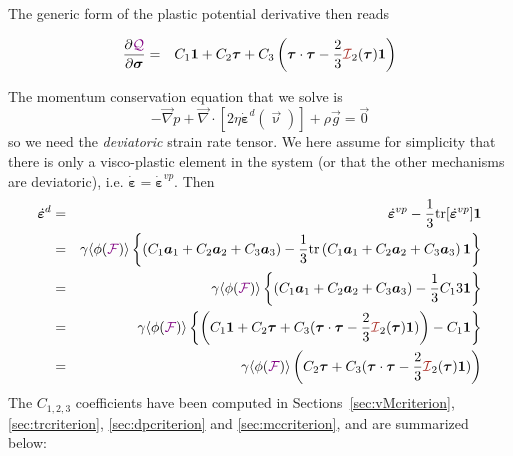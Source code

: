 The generic form of the plastic potential derivative then reads 
\begin{mdframed}[backgroundcolor=blue!5]
\begin{eqnarray}
\frac{\partial \QQQ}{\partial \bm\sigma}
&=&
C_1 {\bm 1} 
+
C_2 {\bm \tau} 
+
C_3  \left( \bm\tau\cdot\bm\tau - \frac23  {\III}_2(\bm\tau)  {\bm 1} \right)
\end{eqnarray}
\end{mdframed}

The momentum conservation equation that we solve is 
\[
-\vec\nabla p + \vec\nabla \cdot \left[
2 \eta \dot{\bm\varepsilon}^d(\vec\upnu) 
\right]+ \rho \vec g = \vec 0
\]
so we need the {\it deviatoric} strain rate tensor. 
We here assume for simplicity that there is only a visco-plastic element in the system
(or that the other mechanisms are deviatoric), 
i.e. $\dot{\bm\varepsilon}=\dot{\bm\varepsilon}^{vp}$.
Then 
\begin{eqnarray}
\dot{\bm\varepsilon}^d 
&=& \dot{\bm\varepsilon}^{vp} - \frac13 {\rm tr}[ \dot{\bm\varepsilon}^{vp}] {\bm 1} \nn\\
&=& \gamma \langle \phi(\FFF) \rangle 
\left\{
\left(C_1 {\bm a}_1 + C_2 {\bm a}_2 + C_3 {\bm a}_3 \right)
-\frac13 {\rm tr} \left(C_1 {\bm a}_1 + C_2 {\bm a}_2 + C_3 {\bm a}_3 \right) {\bm 1}
\right\} \nn\\
&=& \gamma \langle \phi(\FFF) \rangle 
\left\{
\left(C_1 {\bm a}_1 + C_2 {\bm a}_2 + C_3 {\bm a}_3 \right)
-\frac13 
C_1 3  {\bm 1}
\right\} \nn\\
&=& \gamma \langle \phi(\FFF) \rangle 
\left\{
\left(C_1 \bm 1 + C_2 \bm\tau + C_3 (\bm\tau\cdot\bm\tau-\frac23 {\III}_2(\bm\tau)\bm 1)\right)
-C_1 \bm 1
\right\} \nn\\
&=& \gamma \langle \phi(\FFF) \rangle 
\left(C_2 \bm\tau + C_3 (\bm\tau\cdot\bm\tau-\frac23 {\III}_2(\bm\tau)\bm 1)\right)
\end{eqnarray}
The $C_{1,2,3}$ coefficients have been computed in 
Sections~\ref{sec:vMcriterion}, \ref{sec:trcriterion}, \ref{sec:dpcriterion} and 
\ref{sec:mccriterion}, and are summarized below: 

